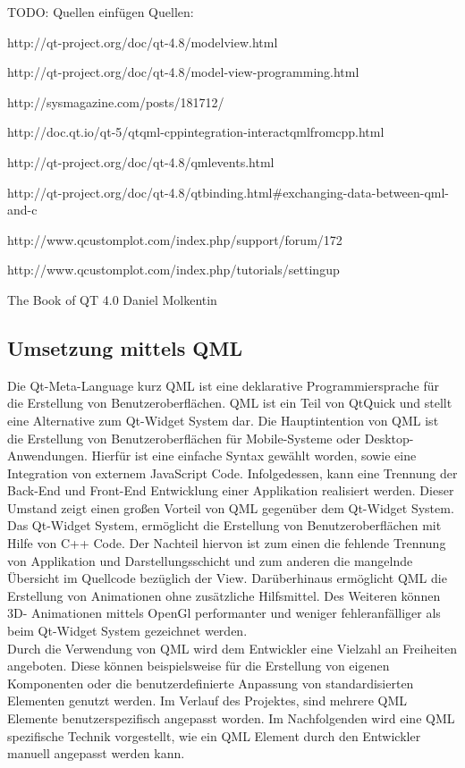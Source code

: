 TODO: Quellen einfügen
Quellen:

http://qt-project.org/doc/qt-4.8/modelview.html

http://qt-project.org/doc/qt-4.8/model-view-programming.html

http://sysmagazine.com/posts/181712/

http://doc.qt.io/qt-5/qtqml-cppintegration-interactqmlfromcpp.html

http://qt-project.org/doc/qt-4.8/qmlevents.html

http://qt-project.org/doc/qt-4.8/qtbinding.html\#exchanging-data-between-qml-and-c

http://www.qcustomplot.com/index.php/support/forum/172

http://www.qcustomplot.com/index.php/tutorials/settingup

The Book of QT 4.0 Daniel Molkentin


\subsection{Umsetzung mittels QML}

Die Qt-Meta-Language kurz QML ist eine deklarative Programmiersprache für die Erstellung von Benutzeroberflächen. QML ist ein Teil von QtQuick und stellt eine Alternative zum Qt-Widget System dar. Die Hauptintention von QML ist die Erstellung von Benutzeroberflächen für Mobile-Systeme oder Desktop-Anwendungen. Hierfür ist eine einfache Syntax gewählt worden, sowie eine Integration von externem JavaScript Code. Infolgedessen, kann eine Trennung der Back-End und Front-End Entwicklung einer Applikation realisiert werden. Dieser Umstand zeigt einen großen Vorteil von QML gegenüber dem Qt-Widget System. Das Qt-Widget System, ermöglicht die Erstellung von Benutzeroberflächen mit Hilfe von C++ Code. Der Nachteil hiervon ist zum einen die fehlende Trennung von Applikation und Darstellungsschicht und zum anderen die mangelnde Übersicht im Quellcode bezüglich der View. Darüberhinaus ermöglicht QML die Erstellung von Animationen ohne zusätzliche Hilfsmittel. Des Weiteren können 3D- Animationen mittels OpenGl performanter und weniger fehleranfälliger als beim Qt-Widget System gezeichnet werden. \\

Durch die Verwendung von QML wird dem Entwickler eine Vielzahl an Freiheiten angeboten. Diese können beispielsweise für die Erstellung von eigenen Komponenten oder die benutzerdefinierte Anpassung von standardisierten Elementen genutzt werden. Im Verlauf des Projektes, sind mehrere QML Elemente benutzerspezifisch angepasst worden. Im Nachfolgenden wird eine QML spezifische Technik vorgestellt, wie ein QML Element durch den Entwickler manuell angepasst werden kann. \\

